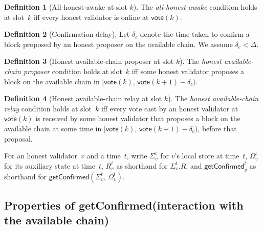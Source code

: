 \ifx\litemode\undefined\documentclass{article}\fi
\newcommand{\syncer}{\mathsf{syncer}}
\newcommand{\start}{\mathsf{start}}
\newcommand{\vote}{\mathsf{vote}}
\newcommand{\getConfirmed}{\textsf{getConfirmed}\xspace}
\theoremstyle{plain}
\newtheorem{property}{Property}
\theoremstyle{definition}
\newtheorem{definition}{Definition}
\theoremstyle{remark}
\newcommand{\GST}{\ensuremath{\mathsf{GST}}}
\newcommand{\HAP}{honest available-chain proposer\xspace}
\newcommand{\HAR}{honest available-chain relay\xspace}
\newcommand{\AHA}{all-honest-awake\xspace}
\begin{document}
\begin{definition}[All-honest-awake at slot $k$]\label{rev:def:all-honest-awake}
The \emph{\AHA} condition holds at slot~$k$ iff every honest validator is online at $\vote(k)$.
\end{definition}

\begin{definition}[Confirmation delay]\label{rev:def:confirmation-delay}
Let $\delta_c$ denote the time taken to confirm a block proposed by an honest proposer on the available chain.
We assume $\delta_c < \Delta$.
\end{definition}

\begin{definition}[Honest available-chain proposer at slot $k$]\label{rev:def:honest-available-chain-proposer}
The \emph{\HAP} condition holds at slot~$k$ iff some honest validator proposes a block on the available chain in $[\vote(k),\, \vote(k+1) - \delta_c)$.
\end{definition}

\begin{definition}[Honest available-chain relay at slot $k$]\label{rev:def:honest-available-chain-relay}
The \emph{\HAR} condition holds at slot~$k$ iff every vote cast by an honest validator at $\vote(k)$ is received by some honest validator that proposes a block on the available chain at some time in $[\vote(k),\, \vote(k+1) - \delta_c)$, before that proposal.
\end{definition}

For an honest validator~$v$ and a time~$t$, write $\Sigma_v^t$ for $v$'s local store at time~$t$, $\Omega_v^t$ for its auxiliary state at time~$t$, $R_v^t$ as shorthand for $\Sigma_v^t.R$, and $\getConfirmed_v^t$ as shorthand for $\getConfirmed(\Sigma_v^t,\, \Omega_v^t)$.


\subsection{Properties of \getConfirmed (interaction with the available chain)}\label{rev:sec:getConfirmed-properties}
\end{document}
